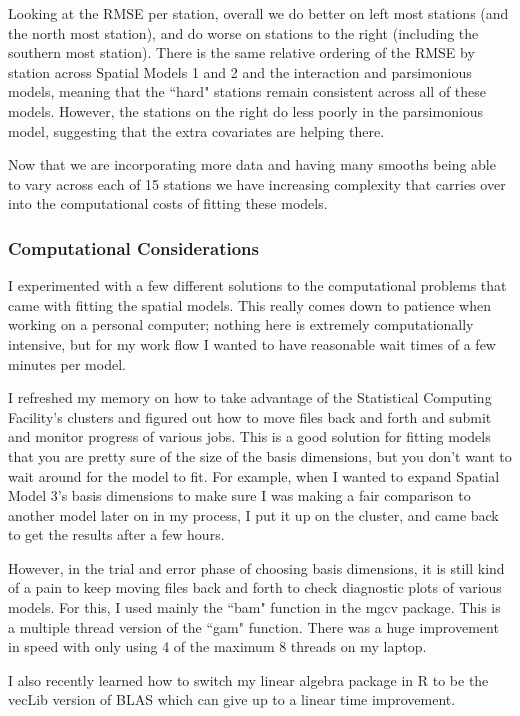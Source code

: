 \documentclass[12pt]{amsart}
\begin{document}
Looking at the RMSE per station,  overall we do better on left most stations (and the north most station), and do worse on stations to the right (including the southern most station). There is the same relative ordering of the RMSE by station across Spatial Models 1 and 2 and the interaction and parsimonious models, meaning that the ``hard" stations remain consistent across all of these models. However, the stations on the right do less poorly in the parsimonious model, suggesting that the extra covariates are helping there. 

Now that we are incorporating more data and having many smooths being able to vary across each of 15 stations we have increasing complexity that carries over into the computational costs of fitting these models. 

\subsubsection{Computational Considerations}

I experimented with a few different solutions to the computational problems that came with fitting the spatial models. This really comes down to patience when working on a personal computer; nothing here is extremely computationally intensive, but for my work flow I wanted to have reasonable wait times of a few minutes per model. 

I refreshed my memory on how to take advantage of the Statistical Computing Facility's clusters and figured out how to move files back and forth and submit and monitor progress of various jobs. This is a good solution for fitting models that you are pretty sure of the size of the basis dimensions, but you don't want to wait around for the model to fit. For example, when I wanted to expand Spatial Model 3's basis dimensions to make sure I was making a fair comparison to another model later on in my process, I put it up on the cluster, and came back to get the results after a few hours.

However, in the trial and error phase of choosing basis dimensions, it is still kind of a pain to keep moving files back and forth to check diagnostic plots of various models. For this, I used mainly the ``bam" function in the mgcv package. This is a multiple thread version of the ``gam" function. There was a huge improvement in speed with only using 4 of the maximum 8 threads on my laptop.

I also recently learned how to switch my linear algebra package in R to be the vecLib version of BLAS which can give up to a linear time improvement. 
\end{document}
